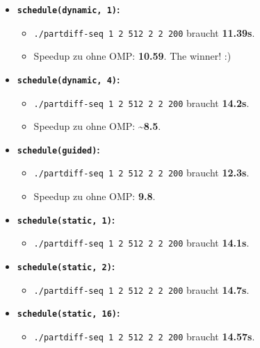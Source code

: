 \documentclass[a4paper,11pt,fleqn]{scrartcl}
\begin{document}
\begin{itemize}
\itemsep1pt\parskip0pt
\item
  \textbf{\texttt{schedule(dynamic, 1)}:}

  \begin{itemize}
  \itemsep1pt\parskip0pt
  \item
    \texttt{./partdiff-seq 1 2 512 2 2 200} braucht \textbf{11.39s}.
  \item
    Speedup zu ohne OMP: \textbf{10.59}. The winner! :)
  \end{itemize}
\item
  \textbf{\texttt{schedule(dynamic, 4)}:}

  \begin{itemize}
  \itemsep1pt\parskip0pt
  \item
    \texttt{./partdiff-seq 1 2 512 2 2 200} braucht \textbf{14.2s}.
  \item
    Speedup zu ohne OMP: \textbf{\textasciitilde{}8.5}.
  \end{itemize}
\item
  \textbf{\texttt{schedule(guided)}:}

  \begin{itemize}
  \itemsep1pt\parskip0pt
  \item
    \texttt{./partdiff-seq 1 2 512 2 2 200} braucht \textbf{12.3s}.
  \item
    Speedup zu ohne OMP: \textbf{9.8}.
  \end{itemize}
\item
  \textbf{\texttt{schedule(static, 1)}:}

  \begin{itemize}
  \itemsep1pt\parskip0pt
  \item
    \texttt{./partdiff-seq 1 2 512 2 2 200} braucht \textbf{14.1s}.
  \end{itemize}
\item
  \textbf{\texttt{schedule(static, 2)}:}

  \begin{itemize}
  \itemsep1pt\parskip0pt
  \item
    \texttt{./partdiff-seq 1 2 512 2 2 200} braucht \textbf{14.7s}.
  \end{itemize}
\item
  \textbf{\texttt{schedule(static, 16)}:}

  \begin{itemize}
  \itemsep1pt\parskip0pt
  \item
    \texttt{./partdiff-seq 1 2 512 2 2 200} braucht \textbf{14.57s}.
  \end{itemize}
\end{itemize}
\end{document}
